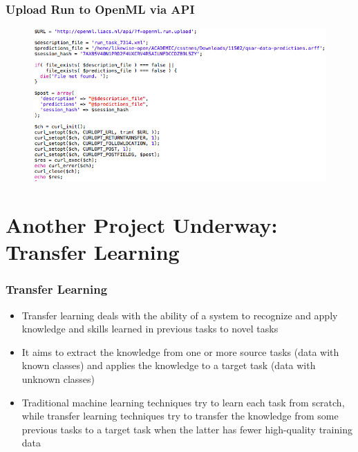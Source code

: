 \documentclass[compress]{beamer}
\begin{document}
\begin{frame}
\frametitle{Upload Run to OpenML via API} 

\begin{figure}[h!]
  \centering
    \includegraphics[width=1.10\textwidth]{openml-run}
\end{figure}

\end{frame}


\section{Another Project Underway: Transfer Learning}
\begin{frame}
\frametitle{Transfer Learning} 
\begin{itemize}%
 \item Transfer learning deals with the ability of a system to recognize and apply knowledge and skills learned in previous tasks to novel tasks
 \item It aims to extract the knowledge from one or more source tasks (data with known classes) and applies the knowledge to a target task (data with unknown classes)
 \item Traditional machine learning techniques try to learn each task from scratch, while transfer learning techniques try to transfer the knowledge from some previous tasks to a target task when the latter has fewer high-quality training data
\end{itemize}
\end{frame}
\end{document}
